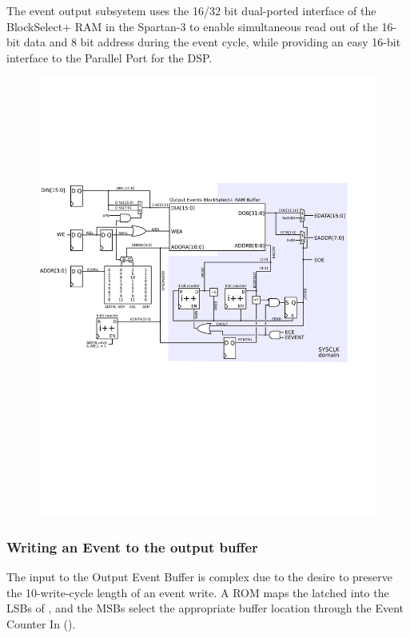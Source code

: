 The event output subsystem uses the 16/32 bit dual-ported interface of
the BlockSelect+ RAM in the Spartan-3 to enable simultaneous read out
of the 16-bit data and 8 bit address during the event cycle, while
providing an easy 16-bit interface to the Parallel Port for the DSP.
\begin{figure}[h!]
\includegraphics[scale=0.8]{output.svg}
\end{figure}



\subsubsection{Writing an Event to the output buffer}


The input to the Output Event Buffer is complex due to the desire to
preserve the 10-write-cycle length of an event write. A ROM maps the
latched  into the LSBs of
, and the MSBs select the appropriate
buffer location through the Event Counter In
().
        
